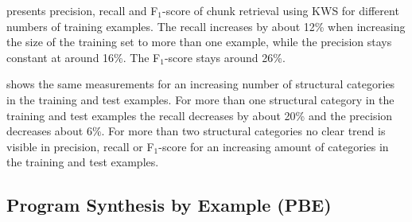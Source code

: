  presents precision, recall and F$_{1}$-score of chunk retrieval using KWS for different numbers of training examples.
The recall increases by about 12\% when increasing the size of the training set to more than one example, while the precision stays constant at around 16\%.
The F$_{1}$-score stays around 26\%.

 shows the same measurements for an increasing number of structural categories in the training and test examples.
For more than one structural category in the training and test examples the recall decreases by about 20\% and the precision decreases about 6\%.
For more than two structural categories no clear trend is visible in precision, recall or F$_{1}$-score for an increasing amount of categories in the training and test examples.



\newpage
\subsection{Program Synthesis by Example (PBE)}

